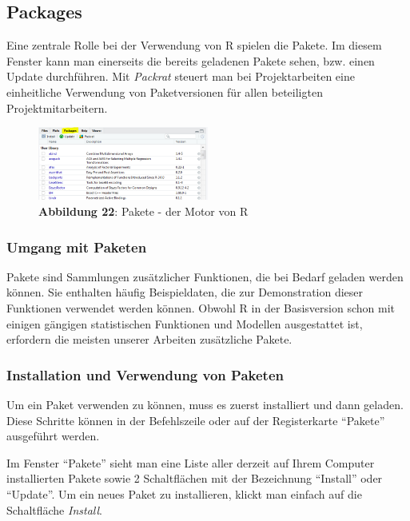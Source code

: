 \documentclass[]{article}
\begin{document}
\subsection*{Packages}\label{packages}

Eine zentrale Rolle bei der Verwendung von R spielen die Pakete. Im
diesem Fenster kann man einerseits die bereits geladenen Pakete sehen,
bzw. einen Update durchführen. Mit \emph{Packrat} steuert man bei
Projektarbeiten eine einheitliche Verwendung von Paketversionen für
allen beteiligten Projektmitarbeitern.

\begin{figure}
\centering
\includegraphics[width=0.50000\textwidth]{Images/05_Packages_Tab.PNG}
\caption{\textbf{Abbildung 22}: Pakete - der Motor von R}
\end{figure}

\subsubsection*{Umgang mit Paketen}\label{umgang-mit-paketen}

Pakete sind Sammlungen zusätzlicher Funktionen, die bei Bedarf geladen
werden können. Sie enthalten häufig Beispieldaten, die zur Demonstration
dieser Funktionen verwendet werden können. Obwohl R in der Basisversion
schon mit einigen gängigen statistischen Funktionen und Modellen
ausgestattet ist, erfordern die meisten unserer Arbeiten zusätzliche
Pakete.

\subsubsection*{Installation und Verwendung von
Paketen}\label{installation-und-verwendung-von-paketen}

Um ein Paket verwenden zu können, muss es zuerst installiert und dann
geladen. Diese Schritte können in der Befehlszeile oder auf der
Registerkarte ``Pakete'' ausgeführt werden.

Im Fenster ``Pakete'' sieht man eine Liste aller derzeit auf Ihrem
Computer installierten Pakete sowie 2 Schaltflächen mit der Bezeichnung
``Install'' oder ``Update''. Um ein neues Paket zu installieren, klickt
man einfach auf die Schaltfläche \emph{Install}.
\end{document}
